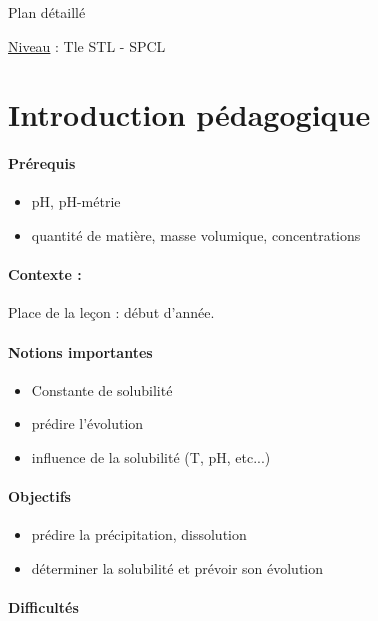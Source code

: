 \begin{reportBlock}{Plan détaillé}

\underline{Niveau} : Tle STL - SPCL \\

\section*{Introduction pédagogique}


\paragraph*{Prérequis}
\begin{itemize}
\item pH, pH-métrie
\item quantité de matière, masse volumique, concentrations
\end{itemize}

\paragraph*{Contexte :}
Place de la leçon : début d'année.

\paragraph*{Notions importantes}

\begin{itemize}
\item Constante de solubilité
\item prédire l'évolution
\item influence de la solubilité (T, pH, etc...)
\end{itemize}

\paragraph*{Objectifs}

\begin{itemize}
\item prédire la précipitation, dissolution
\item déterminer la solubilité et prévoir son évolution
\end{itemize}

\paragraph*{Difficultés}


\end{reportBlock}
